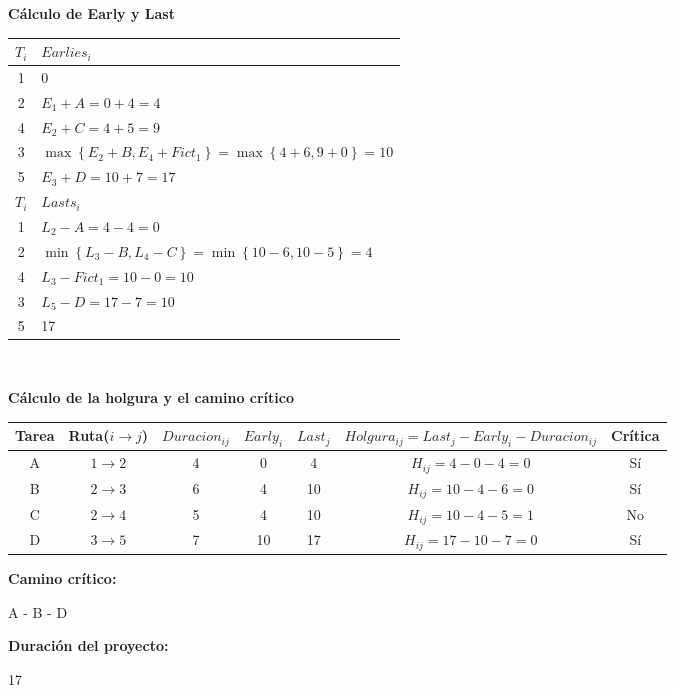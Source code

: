 \documentclass{llncs}
\begin{document}
\vspace{0.5cm}

\textbf{Cálculo de Early y Last}
\begin{table}
\label{tab:tabla2}
\centering
\begin{tabular}{C|l}
\toprule
$T_i$ & $Earlies_i$ \\
 & 0 \\
 & $E_1 + A = 0 + 4 = 4$ \\
 & $E_2 + C = 4 + 5 = 9$ \\
 & $\max \left\{ E_2 + B, E_4 + Fict_1 \right\} = \max \left\{ 4 + 6, 9 + 0 \right\} = 10$ \\
 & $E_3 + D = 10 + 7 = 17$ \\
\bottomrule
\toprule
$T_i$ & $Lasts_i$ \\
 & $L_2 - A = 4 - 4 = 0$ \\
 & $\min \left\{ L_3 - B, L_4 - C \right\} = \min \left\{ 10 - 6, 10 - 5 \right\} = 4$ \\
 & $L_3 - Fict_1 = 10 - 0 = 10$ \\
 & $L_5 - D = 17 - 7 = 10$ \\
 & 17 \\
\bottomrule
\end{tabular}
\end{table} \\

\newpage

\textbf{Cálculo de la holgura y el camino crítico}
\begin{table}
\label{tab:tabla3}
\centering
\begin{tabular}{C|CCCCcC}
\toprule
Tarea & Ruta($i \rightarrow j$) & $Duracion_{ij}$ & $Early_i$ & $Last_j$ & $Holgura_{ij} = Last_j - Early_i - Duracion_{ij}$ & Crítica \\
\midrule
A & $1 \rightarrow 2$ & 4 & 0 & 4 & $H_{ij} = 4 - 0 - 4 = 0$ & Sí \\
B & $2 \rightarrow 3$ & 6 & 4 & 10 & $H_{ij} = 10 - 4 - 6 = 0$ & Sí \\
C & $2 \rightarrow 4$ & 5 & 4 & 10 & $H_{ij} = 10 - 4 - 5 = 1$ & No \\
D & $3 \rightarrow 5$ & 7 & 10 & 17 & $H_{ij} = 17 - 10 - 7 = 0$ & Sí \\
\bottomrule
\end{tabular}
\end{table}

\begin{multicols}{2}
\textbf{Camino crítico:}

A - B - D

\textbf{Duración del proyecto:}

17
\end{multicols}
\end{document}
